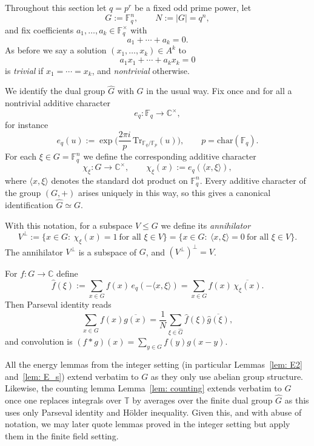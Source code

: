 \documentclass[A4paper,reqno,oneside,12pt]{amsart}
\theoremstyle{plain}
\theoremstyle{definition}
\newcommand{\C}{\mathbb{C}}
\newcommand{\F}{\mathbb{F}}
\newcommand{\TT}{\mathbb{T}}
\begin{document}
Throughout this section let $q=p^r$ be a fixed odd prime power, let
\[
G:=\F_q^n,\qquad N:=|G|=q^n,
\]
and fix coefficients $a_1,\dots,a_k\in\F_q^\times$ with
\[
a_1+\cdots+a_k=0.
\]
As before we say a solution $(x_1,\dots,x_k)\in A^k$ to
\begin{equation}\label{eq:FF-eqn}
a_1x_1+\cdots+a_kx_k=0
\end{equation}
is \emph{trivial} if $x_1=\cdots=x_k$, and \emph{nontrivial} otherwise.

We identify the dual group $\widehat G$ with $G$ in the usual way. 
Fix once and for all a nontrivial additive character
\[
e_q:\F_q\to\C^\times,
\]
for instance
\[
e_q(u):=\exp\!\Big(\frac{2\pi i}{p}\,\mathrm{Tr}_{\F_q/\F_p}(u)\Big),
\qquad p=\mathrm{char}(\F_q).
\]
For each $\xi\in G=\F_q^n$ we define the corresponding additive character
\[
\chi_\xi:G\to\C^\times,
\qquad
\chi_\xi(x):=e_q(\langle x,\xi\rangle),
\]
where $\langle x,\xi\rangle$ denotes the standard dot product on $\F_q^n$.
Every additive character of the group $(G,+)$ arises uniquely in this way, so this gives a canonical
identification $\widehat G\simeq G$.

With this notation, for a subspace $V\le G$ we define its \emph{annihilator}
\[
V^\perp
:=\{x\in G:\ \chi_\xi(x)=1\ \text{for all }\xi\in V\}
=\{x\in G:\ \langle x,\xi\rangle=0\ \text{for all }\xi\in V\}.
\]
The annihilator $V^\perp$ is a subspace of $G$, and $(V^\perp)^\perp=V$.

For $f:G\to\C$ define
\[
\widehat f(\xi):=\sum_{x\in G} f(x)\,e_q(-\langle x,\xi\rangle)=\sum_{x\in G} f(x)\,\overline{\chi_\xi(x)}.
\]
Then Parseval identity reads
\[
\sum_{x\in G} f(x)\overline{g(x)}=\frac{1}{N}\sum_{\xi\in \widehat G}\widehat f(\xi)\overline{\widehat g(\xi)},
\]
and convolution is $(f*g)(x)=\sum_{y\in G} f(y)g(x-y)$.

All the energy lemmas from the integer setting (in particular Lemmas~\ref{lem: E2} and~\ref{lem: E_s})
extend verbatim to $G$ as they only use abelian group structure. Likewise, the counting lemma
Lemma~\ref{lem: counting} extends verbatim to $G$ once one replaces integrals over $\TT$ by averages over
the finite dual group $\widehat G$ as this uses only Parseval identity and H\"older inequality. Given this, and with abuse of notation, we may later quote lemmas proved in the integer setting but apply them in the finite field setting. 
\end{document}
